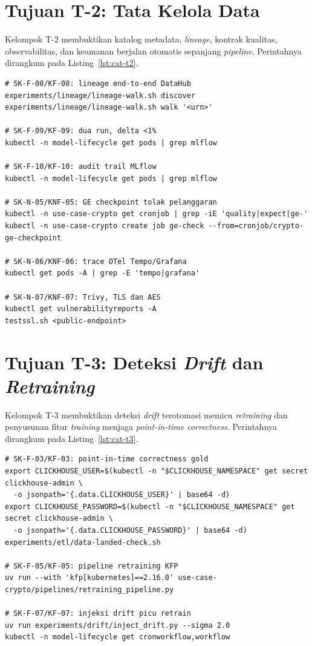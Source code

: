 \section{Tujuan T-2: Tata Kelola Data}
\label{sec:appx-t2}

Kelompok T-2 membuktikan katalog metadata, \textit{lineage}, kontrak kualitas, observabilitas, dan keamanan berjalan otomatis sepanjang \textit{pipeline}. Perintahnya dirangkum pada Listing~\ref{lst:cat-t2}.

\begin{lstlisting}[caption={Perintah verifikasi tujuan T-2 (dari \texttt{\textasciitilde/documents/ta/})},label={lst:cat-t2},basicstyle=\ttfamily\footnotesize,breaklines=true,captionpos=t]
# SK-F-08/KF-08: lineage end-to-end DataHub
experiments/lineage/lineage-walk.sh discover
experiments/lineage/lineage-walk.sh walk '<urn>'

# SK-F-09/KF-09: dua run, delta <1%
kubectl -n model-lifecycle get pods | grep mlflow

# SK-F-10/KF-10: audit trail MLflow
kubectl -n model-lifecycle get pods | grep mlflow

# SK-N-05/KNF-05: GE checkpoint tolak pelanggaran
kubectl -n use-case-crypto get cronjob | grep -iE 'quality|expect|ge-'
kubectl -n use-case-crypto create job ge-check --from=cronjob/crypto-ge-checkpoint

# SK-N-06/KNF-06: trace OTel Tempo/Grafana
kubectl get pods -A | grep -E 'tempo|grafana'

# SK-N-07/KNF-07: Trivy, TLS dan AES
kubectl get vulnerabilityreports -A
testssl.sh <public-endpoint>
\end{lstlisting}

\section{Tujuan T-3: Deteksi \textit{Drift} dan \textit{Retraining}}
\label{sec:appx-t3}

Kelompok T-3 membuktikan deteksi \textit{drift} terotomasi memicu \textit{retraining} dan penyusunan fitur \textit{training} menjaga \textit{point-in-time correctness}. Perintahnya dirangkum pada Listing~\ref{lst:cat-t3}.

\begin{lstlisting}[caption={Perintah verifikasi tujuan T-3 (dari \texttt{\textasciitilde/documents/ta/})},label={lst:cat-t3},basicstyle=\ttfamily\footnotesize,breaklines=true,captionpos=t]
# SK-F-03/KF-03: point-in-time correctness gold
export CLICKHOUSE_USER=$(kubectl -n "$CLICKHOUSE_NAMESPACE" get secret clickhouse-admin \
  -o jsonpath='{.data.CLICKHOUSE_USER}' | base64 -d)
export CLICKHOUSE_PASSWORD=$(kubectl -n "$CLICKHOUSE_NAMESPACE" get secret clickhouse-admin \
  -o jsonpath='{.data.CLICKHOUSE_PASSWORD}' | base64 -d)
experiments/etl/data-landed-check.sh

# SK-F-05/KF-05: pipeline retraining KFP
uv run --with 'kfp[kubernetes]==2.16.0' use-case-crypto/pipelines/retraining_pipeline.py

# SK-F-07/KF-07: injeksi drift picu retrain
uv run experiments/drift/inject_drift.py --sigma 2.0
kubectl -n model-lifecycle get cronworkflow,workflow
\end{lstlisting}

